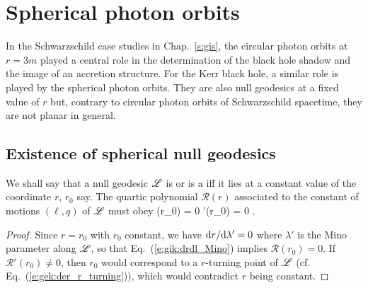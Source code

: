 
\section{Spherical photon orbits} \label{s:gik:spherical_orbits}

In the Schwarzschild case studies in Chap.~\ref{s:gis}, the circular photon
orbits at $r=3m$ played a central role in the determination of
the black hole shadow and the image of an accretion structure.
For the Kerr black hole, a similar role is played by the spherical photon
orbits. They are also null geodesics at a fixed value of $r$ but, contrary
to circular photon orbits of Schwarzschild spacetime, they are not planar
in general.


\subsection{Existence of spherical null geodesics}

We shall say that a null geodesic $\mathscr{L}$ is  or
is a  iff it lies at a constant value of the coordinate $r$, $r_0$ say.
The quartic polynomial $\mathcal{R}(r)$ associated to the constant of motions $(\ell,q)$ of $\mathscr{L}$
must obey
\be \label{e:gik:R_Rp_r0_zero}
    (r_0) = 0 \qand {}'(r_0) = 0 .
\ee
\begin{proof}
Since $r=r_0$ with $r_0$ constant, we have $\mathrm{d} r/\mathrm{d}\lambda' = 0$ where $\lambda'$ is the Mino parameter along $\mathscr{L}$, so
that Eq.~(\ref{e:gik:drdl_Mino}) implies $\mathcal{R}(r_0) = 0$. If $\mathcal{R}'(r_0) \neq 0$,
then $r_0$ would correspond to a $r$-turning point of $\mathscr{L}$  (cf. Eq.~(\ref{e:gek:der_r_turning})),
which would contradict $r$ being constant.
\end{proof}

